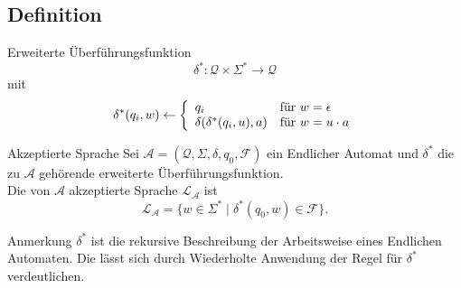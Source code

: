 \documentclass[]{beamer}
\begin{document}
\subsection{Definition}
\begin{frame}[<+->][squeeze]{}
  \begin{block}{Erweiterte Überführungsfunktion}
    \[\delta^* : \mathcal{Q} \times \Sigma^* \rightarrow \mathcal{Q}\]
    mit
    \[\delta^*(q_i, w) \leftarrow \left\{
                                    \begin{array}{l l}
                                      q_i & \text{für } w = \epsilon \\
                                      \delta(\delta^*(q_i, u), a) & \text{für } w = u \cdot a
                                    \end{array} \right.\]
  \end{block}
  
  \vspace*{-0.5em}
  
  \begin{block}{Akzeptierte Sprache}
    Sei $\mathcal{A} = (\mathcal{Q}, \Sigma, \delta, q_0, \mathcal{F})$ ein Endlicher Automat und $\delta^*$ die zu $\mathcal{A}$ gehörende erweiterte Überführungsfunktion. \\
    Die von $\mathcal{A}$ akzeptierte Sprache $\mathcal{L}_\mathcal{A}$ ist
    \[\mathcal{L_A} = \{w \in \Sigma^* \;|\; \delta^*(q_0, w) \in \mathcal{F}\}.\]
  \end{block}
  
  \vspace*{-0.5em}
  
  \begin{exampleblock}{Anmerkung}
    $\delta^*$ ist die rekursive Beschreibung der Arbeitsweise eines Endlichen Automaten. Die lässt sich durch Wiederholte Anwendung der Regel für $\delta^*$ verdeutlichen.
  \end{exampleblock}
\end{frame}
\end{document}

